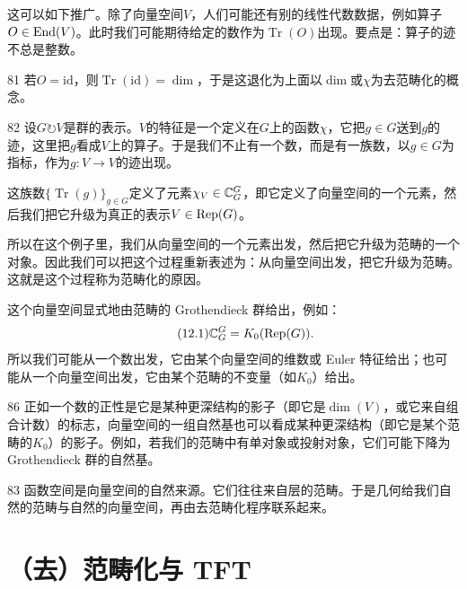这可以如下推广。除了向量空间$V$，人们可能还有别的线性代数数据，例如算子$O\in\mathrm{End}(V)$。此时我们可能期待给定的数作为$\operatorname{Tr}(O)$出现。要点是：算子的迹不总是整数。

\begin{srcex}{81}
若$O=\mathrm{id}$，则$\operatorname{Tr}(\mathrm{id})=\dim$，于是这退化为上面以$\dim$或$\chi$为去范畴化的概念。
\end{srcex}

\begin{srcex}{82}
设$G\circlearrowright V$是群的表示。$V$的特征是一个定义在$G$上的函数$\chi$，它把$g\in G$送到$g$的迹，这里把$g$看成$V$上的算子。于是我们不止有一个数，而是有一族数，以$g\in G$为指标，作为$g\colon V\to V$的迹出现。
\end{srcex}

这族数$\{\operatorname{Tr}(g)\}_{g\in G}$定义了元素$\chi_V\in\mathbb{C}^{G}_{G}$，即它定义了向量空间的一个元素，然后我们把它升级为真正的表示$V\in\mathrm{Rep}(G)$。

所以在这个例子里，我们从向量空间的一个元素出发，然后把它升级为范畴的一个对象。因此我们可以把这个过程重新表述为：从向量空间出发，把它升级为范畴。这就是这个过程称为范畴化的原因。

这个向量空间显式地由范畴的 Grothendieck 群给出，例如：
\begin{equation}\tag{12.1}
\mathbb{C}^{G}_{G}=K_0(\mathrm{Rep}(G)).
\end{equation}
所以我们可能从一个数出发，它由某个向量空间的维数或 Euler 特征给出；也可能从一个向量空间出发，它由某个范畴的不变量（如$K_0$）给出。

\begin{srcrem}{86}
正如一个数的正性是它是某种更深结构的影子（即它是$\dim(V)$，或它来自组合计数）的标志，向量空间的一组自然基也可以看成某种更深结构（即它是某个范畴的$K_0$）的影子。例如，若我们的范畴中有单对象或投射对象，它们可能下降为 Grothendieck 群的自然基。
\end{srcrem}

\begin{srcex}{83}
函数空间是向量空间的自然来源。它们往往来自层的范畴。于是几何给我们自然的范畴与自然的向量空间，再由去范畴化程序联系起来。
\end{srcex}


\section{（去）范畴化与 TFT}\label{sec:12-2}

